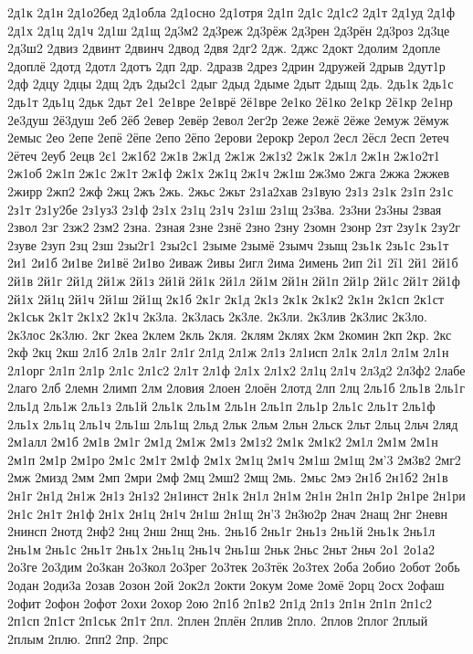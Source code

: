 2д1к
2д1н
2д1о2бед
2д1обла
2д1осно
2д1отря
2д1п
2д1с
2д1с2
2д1т
2д1уд
2д1ф
2д1х
2д1ц
2д1ч
2д1ш
2д1щ
2д3м2
2д3реж
2д3рёж
2д3рен
2д3рён
2д3роз
2д3це
2д3ш2
2двиз
2двинт
2двинч
2двод
2двя
2дг2
2дж.
2джс
2докт
2долим
2допле
2доплё
2дотд
2дотл
2дотъ
2дп
2др.
2дразв
2дрез
2дрин
2дружей
2дрыв
2дут1р
2дф
2дцу
2дцы
2дщ
2дъ
2ды2с1
2дыг
2дыд
2дыме
2дыт
2дыщ
2дь.
2дь1к
2дь1с
2дь1т
2дь1ц
2дьк
2дьт
2е1
2е1вре
2е1врё
2ё1вре
2е1ко
2ё1ко
2е1кр
2ё1кр
2е1нр
2е3душ
2ё3душ
2еб
2ёб
2евер
2евёр
2евол
2ег2р
2еже
2ежё
2ёже
2емуж
2ёмуж
2емыс
2ео
2епе
2епё
2ёпе
2епо
2ёпо
2ерови
2ерокр
2ерол
2есл
2ёсл
2есп
2етеч
2ётеч
2еуб
2ецв
2є1
2ж1б2
2ж1в
2ж1д
2ж1ж
2ж1з2
2ж1к
2ж1л
2ж1н
2ж1о2т1
2ж1об
2ж1п
2ж1с
2ж1т
2ж1ф
2ж1х
2ж1ц
2ж1ч
2ж1ш
2ж3мо
2жга
2жжа
2жжев
2жирр
2жп2
2жф
2жц
2жъ
2жь.
2жьс
2жьт
2з1а2хав
2з1вую
2з1з
2з1к
2з1п
2з1с
2з1т
2з1у2бе
2з1уз3
2з1ф
2з1х
2з1ц
2з1ч
2з1ш
2з1щ
2з3ва.
2з3ни
2з3ны
2звая
2звол
2зг
2зж2
2зм2
2зна.
2зная
2зне
2знё
2зно
2зну
2зомн
2зонр
2зт
2зу1к
2зу2г
2зуве
2зуп
2зц
2зш
2зы2г1
2зы2с1
2зыме
2зымё
2зымч
2зыщ
2зь1к
2зь1с
2зь1т
2и1
2и1б
2и1ве
2и1вё
2и1во
2иваж
2ивы
2игл
2има
2имень
2ип
2і1
2ї1
2й1
2й1б
2й1в
2й1г
2й1д
2й1ж
2й1з
2й1й
2й1к
2й1л
2й1м
2й1н
2й1п
2й1р
2й1с
2й1т
2й1ф
2й1х
2й1ц
2й1ч
2й1ш
2й1щ
2к1б
2к1г
2к1д
2к1з
2к1к
2к1к2
2к1н
2к1сп
2к1ст
2к1ськ
2к1т
2к1х2
2к1ч
2к3ла.
2к3лась
2к3ле.
2к3ли.
2к3лив
2к3лис
2к3ло.
2к3лос
2к3лю.
2кг
2кеа
2клем
2кль
2кля.
2клям
2клях
2км
2комин
2кп
2кр.
2кс
2кф
2кц
2кш
2л1б
2л1в
2л1г
2л1ґ
2л1д
2л1ж
2л1з
2л1исп
2л1к
2л1л
2л1м
2л1н
2л1орг
2л1п
2л1р
2л1с
2л1с2
2л1т
2л1ф
2л1х
2л1х2
2л1ц
2л1ч
2л3д2
2л3ф2
2лабе
2лаго
2лб
2лемн
2лимп
2лм
2ловия
2лоен
2лоён
2лотд
2лп
2лц
2ль1б
2ль1в
2ль1г
2ль1д
2ль1ж
2ль1з
2ль1й
2ль1к
2ль1м
2ль1н
2ль1п
2ль1р
2ль1с
2ль1т
2ль1ф
2ль1х
2ль1ц
2ль1ч
2ль1ш
2ль1щ
2льд
2льк
2льм
2льн
2льск
2льт
2льц
2льч
2ляд
2м1алл
2м1б
2м1в
2м1г
2м1д
2м1ж
2м1з
2м1з2
2м1к
2м1к2
2м1л
2м1м
2м1н
2м1п
2м1р
2м1ро
2м1с
2м1т
2м1ф
2м1х
2м1ц
2м1ч
2м1ш
2м1щ
2м'3
2м3в2
2мг2
2мж
2мизд
2мм
2мп
2мри
2мф
2мц
2мш2
2мщ
2мь.
2мьс
2мэ
2н1б
2н1б2
2н1в
2н1г
2н1д
2н1ж
2н1з
2н1з2
2н1инст
2н1к
2н1л
2н1м
2н1н
2н1п
2н1р
2н1ре
2н1ри
2н1с
2н1т
2н1ф
2н1х
2н1ц
2н1ч
2н1ш
2н1щ
2н'3
2н3ю2р
2нач
2нащ
2нг
2невн
2нинсп
2нотд
2нф2
2нц
2нш
2нщ
2нь.
2нь1б
2нь1г
2нь1з
2нь1й
2нь1к
2нь1л
2нь1м
2нь1с
2нь1т
2нь1х
2нь1ц
2нь1ч
2нь1ш
2ньк
2ньс
2ньт
2ньч
2о1
2о1а2
2о3ге
2о3дим
2о3кан
2о3кол
2о3рег
2о3тек
2о3тёк
2о3тех
2оба
2обио
2обот
2обь
2одан
2оди3а
2озав
2озон
2ой
2ок2л
2окти
2окум
2оме
2омё
2орц
2осх
2офаш
2офит
2офон
2офот
2охи
2охор
2ою
2п1б
2п1в2
2п1д
2п1з
2п1н
2п1п
2п1с2
2п1сп
2п1ст
2п1ськ
2п1т
2пл.
2плен
2плён
2плив
2пло.
2плов
2плог
2плый
2плым
2плю.
2пп2
2пр.
2прс
